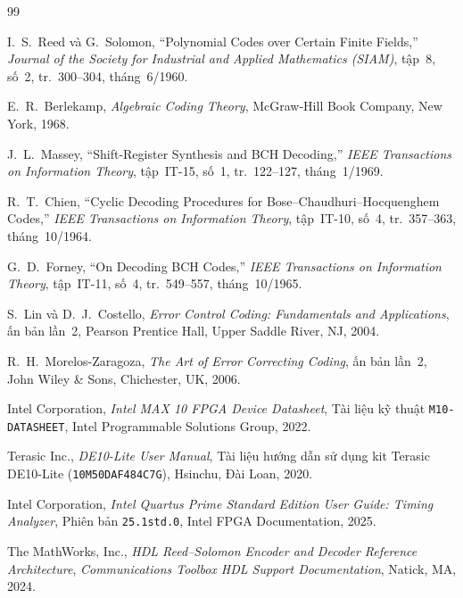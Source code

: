 \documentclass[11pt,a4paper]{report}
\begin{document}
\begin{thebibliography}{99}

I.~S.~Reed và G.~Solomon, ``Polynomial Codes over Certain Finite Fields,'' \textit{Journal of the Society for Industrial and Applied Mathematics (SIAM)}, tập~8, số~2, tr.~300--304, tháng~6/1960.

E.~R.~Berlekamp, \textit{Algebraic Coding Theory}, McGraw-Hill Book Company, New York, 1968.

J.~L.~Massey, ``Shift-Register Synthesis and BCH Decoding,'' \textit{IEEE Transactions on Information Theory}, tập~IT-15, số~1, tr.~122--127, tháng~1/1969.

R.~T.~Chien, ``Cyclic Decoding Procedures for Bose--Chaudhuri--Hocquenghem Codes,'' \textit{IEEE Transactions on Information Theory}, tập~IT-10, số~4, tr.~357--363, tháng~10/1964.

G.~D.~Forney, ``On Decoding BCH Codes,'' \textit{IEEE Transactions on Information Theory}, tập~IT-11, số~4, tr.~549--557, tháng~10/1965.

S.~Lin và D.~J.~Costello, \textit{Error Control Coding: Fundamentals and Applications}, ấn bản lần~2, Pearson Prentice Hall, Upper Saddle River, NJ, 2004.

R.~H.~Morelos-Zaragoza, \textit{The Art of Error Correcting Coding}, ấn bản lần~2, John Wiley \& Sons, Chichester, UK, 2006.

Intel Corporation, \textit{Intel MAX 10 FPGA Device Datasheet}, Tài liệu kỹ thuật \texttt{M10-DATASHEET}, Intel Programmable Solutions Group, 2022.

Terasic Inc., \textit{DE10-Lite User Manual}, Tài liệu hướng dẫn sử dụng kit Terasic DE10-Lite (\texttt{10M50DAF484C7G}), Hsinchu, Đài Loan, 2020.

Intel Corporation, \textit{Intel Quartus Prime Standard Edition User Guide: Timing Analyzer}, Phiên bản \texttt{25.1std.0}, Intel FPGA Documentation, 2025.

The MathWorks, Inc., \textit{HDL Reed--Solomon Encoder and Decoder Reference Architecture}, \textit{Communications Toolbox HDL Support Documentation}, Natick, MA, 2024.

\end{thebibliography}
\end{document}
